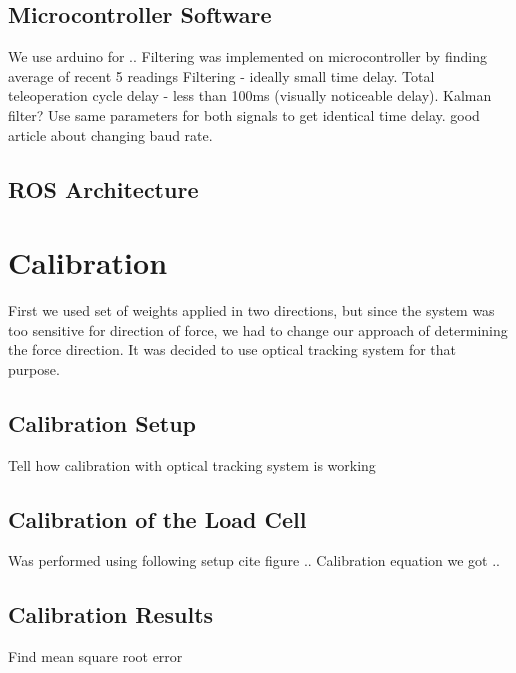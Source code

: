 	\subsection{Microcontroller Software}
	\label{sec:MicrSoft}
	We use arduino for ..
	Filtering was implemented on microcontroller by finding average of recent 5 readings 
	Filtering - ideally small time delay. Total teleoperation cycle delay - less than 100ms (visually noticeable delay). Kalman filter? Use same parameters for both signals to get identical time delay.
	good article about changing baud rate.

	\subsection{ROS Architecture}
	\label{sec:p2}
	
\section{Calibration}
\label{section:Calibration}
First we used set of weights applied in two directions, but since the system was too sensitive for direction of force, we had to change our approach of determining the force direction. It was decided to use optical tracking system for that purpose.

	\subsection{Calibration Setup}
	\label{sec:CalSetup}
	Tell how calibration with optical tracking system is working

	\subsection{Calibration of the Load Cell}
	\label{sec:CalLoadCell}
	Was performed using following setup cite figure ..
	Calibration equation we got ..

	\subsection{Calibration Results}
	Find mean square root error

